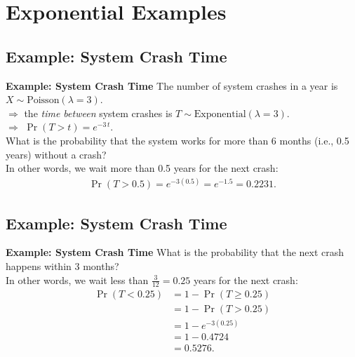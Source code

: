 \documentclass[compress]{beamer}        %
\makeatletter
\newcommand{\tcb}{\textcolor{beamer@blendedblue}}
\makeatother
\begin{document}
\section{Exponential Examples}
\subsection{Example: System Crash Time}
\begin{frame}{\bf \tcb{Example: System Crash Time}}
The number of system crashes in a year is  $X \sim \text{Poisson}(\lambda=3)$.\\[0.2cm]
$\Rightarrow$ the \emph{time between} system crashes is $T \sim \text{Exponential}(\lambda=3)$.\\[0.2cm]
$\Rightarrow$ $\Pr(T > t) = e^{-3\,t}$.\\[0.9cm]

What is the probability that the system works for more than 6 months (i.e., 0.5 years) without a crash?\\[0.5cm]
In other words, we wait more than 0.5 years for the next crash:\\[-0.3cm]
\begin{align*}
\Pr(T>0.5) = e^{-3(0.5)} = e^{-1.5} = 0.2231.
\end{align*}

\end{frame}


\subsection{Example: System Crash Time}
\begin{frame}{\bf \tcb{Example: System Crash Time}}
What is the probability that the next crash happens within 3 months?\\[0.3cm]
In other words, we wait less than $\frac{3}{12} = 0.25$ years for the next crash:\\
\begin{align*}
\Pr(T<0.25) &= 1-\Pr(T\ge0.25) \tag{$\ge$ the same as $>$}\\[0.2cm]
&= 1-\Pr(T>0.25) \tag{since $T$ is continuous}\\[0.2cm]
&= 1-e^{-3(0.25)} \\[0.2cm]
&= 1-0.4724  \\[0.2cm]
&= 0.5276.
\end{align*}

\end{frame}
\end{document}
